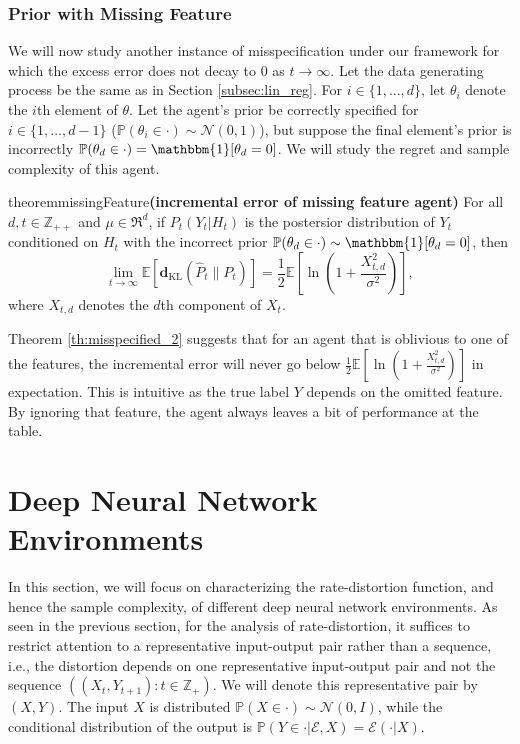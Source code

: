\documentclass[twoside,11pt]{article}
\def\environment{\mathcal{E}}
\def\KL{\mathbf{d}_{\mathrm{KL}}}
\def\E{\mathbb{E}}
\def\Pr{\mathbb{P}}
\begin{document}
\subsubsection{Prior with Missing Feature}
We will now study another instance of misspecification under our framework for which the excess error does not decay to $0$ as $t\rightarrow\infty$. Let the data generating process be the same as in Section \ref{subsec:lin_reg}. For $i\in \{1, \hdots, d\}$, let $\theta_i$ denote the $i$th element of $\theta$. Let the agent's prior be correctly specified for $i \in \{1, \hdots, d-1\}$ ($\Pr(\theta_i\in\cdot) \sim \mathcal{N}(0, 1)$), but suppose the final element's prior is incorrectly $\Pr(\theta_d\in\cdot) = \mathbbm{1}[\theta_d = 0]$. We will study the regret and sample complexity of this agent.

\begin{restatable}{theorem}{missingFeature}{\bf (incremental error of missing feature agent)}
    \label{th:misspecified_2}
    For all $d, t \in \mathbb{Z}_{++}$ and $\mu \in \Re^d$, if $P_t(Y_t|H_t)$ is the postersior distribution of $Y_t$ conditioned on $H_t$ with the incorrect prior $\Pr(\theta_d\in\cdot)\sim \mathbbm{1}[\theta_d = 0]$, then
    $$\lim_{t\rightarrow\infty}\E\left[\KL(\hat{P}_t\|P_t)\right] = \frac{1}{2}\E\left[\ln\left(1 + \frac{X^2_{t,d}}{\sigma^2}\right)\right],$$
    where $X_{t,d}$ denotes the $d$th component of $X_t$.
\end{restatable}
Theorem \ref{th:misspecified_2} suggests that for an agent that is oblivious to one of the features, the incremental error will never go below $\frac{1}{2}\E\left[\ln\left(1 + \frac{X^2_{t,d}}{\sigma^2}\right)\right]$ in expectation. This is intuitive as the true label $Y$ depends on the omitted feature. By ignoring that feature, the agent always leaves a bit of performance at the table.

\section{Deep Neural Network Environments}
\label{sec:deep-neural-network}
In this section, we will focus on characterizing the rate-distortion function, and hence the sample complexity, of different deep neural network environments. As seen in the previous section, for the analysis of rate-distortion, it suffices to restrict attention to a representative input-output pair rather than a sequence, i.e., the distortion depends on one representative input-output pair and not the sequence $((X_t, Y_{t+1}): t\in\mathbb{Z}_+ )$.  We will denote this representative pair by $(X,Y)$.  The input $X$ is distributed $\Pr(X \in \cdot) \sim \mathcal{N}(0,I)$, while the conditional distribution of the output is $\Pr(Y \in \cdot | \environment, X) = \environment(\cdot|X)$.
\end{document}
